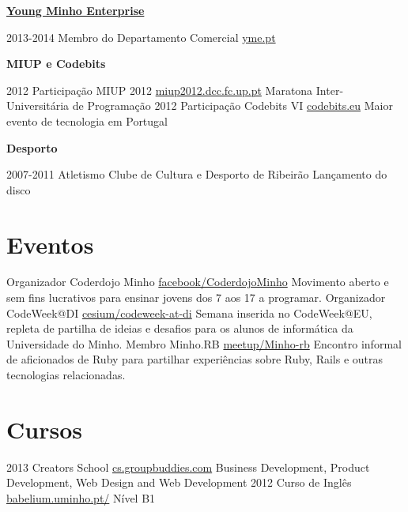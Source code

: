 \documentclass[]{friggeri-cv}
\begin{document}
\textbf{\Large \href{http://www.yme.pt/‎}{Young Minho Enterprise}} 

\begin{entrylist}
  \entry
    {2013-2014}
    {Membro do Departamento Comercial}
    {\href{http://www.yme.pt/}{yme.pt}} 
    {}
\end{entrylist}

\textbf{\Large MIUP e Codebits} 

\begin{entrylist}
  \entry
    {2012}
    {Participação MIUP 2012}
    {\href{http://miup2012.dcc.fc.up.pt/}{miup2012.dcc.fc.up.pt}} 
    {Maratona Inter-Universitária de Programação}
  \entry
    {2012}
    {Participação Codebits VI}
    {\href{https://codebits.eu/}{codebits.eu}} 
    {Maior evento de tecnologia em Portugal}
\end{entrylist}

\textbf{\Large Desporto} 

\begin{entrylist}
  \entry
    {2007-2011}
    {Atletismo}
    {Clube de Cultura e Desporto de Ribeirão} 
    {Lançamento do disco}
\end{entrylist}

\section{Eventos}
\begin{entrylist}
  \entry
    {Organizador}
    {Coderdojo Minho}
    {\href{https://www.facebook.com/CoderdojoMinho}{facebook/CoderdojoMinho}} 
    {Movimento aberto e sem fins lucrativos para ensinar jovens dos 7 aos 17 a programar.}
  \entry
    {Organizador}
    {CodeWeek@DI}
    {\href{http://www.cesium.di.uminho.pt/2013/11/23/codeweek-at-di}{cesium/codeweek-at-di}} 
    {Semana inserida no CodeWeek@EU, repleta de partilha de ideias e desafios para os alunos de informática da Universidade do Minho.}
  \entry
    {Membro}
    {Minho.RB}
    {\href{http://www.meetup.com/Minho-rb/}{meetup/Minho-rb}} 
    {Encontro informal de aficionados de Ruby para partilhar experiências sobre Ruby, Rails e outras tecnologias relacionadas.}
\end{entrylist}

\section{Cursos}

\begin{entrylist}
  \entry
    {2013}
    {Creators School}
    {\href{http://cs.groupbuddies.com/}{cs.groupbuddies.com}} 
    {Business Development, Product Development, Web Design and Web Development}
  \entry
    {2012}
    {Curso de Inglês}
    {\href{http://www.babelium.uminho.pt/}{babelium.uminho.pt/}} 
    {Nível B1}
\end{entrylist}
\end{document}
